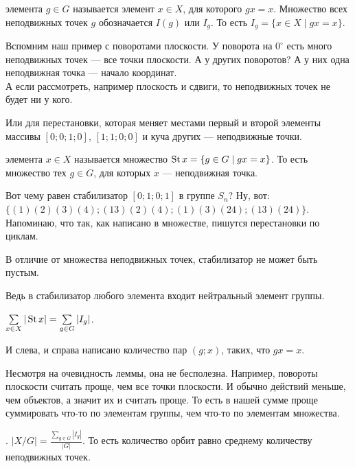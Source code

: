 \documentclass{article}
\begin{document}
\begin{itemize}
\begin{Example}
        \end{Example}
        \dfn {} элемента $g\in G$ называется элемент $x\in X$, для которого $gx=x$. Множество всех неподвижных точек $g$ обозначается $I(g)$ или $I_g$. То есть $I_g=\{x\in X\mid gx=x\}$.
        \begin{Example}
            Вспомним наш пример с поворотами плоскости. У поворота на $0^\circ$ есть много неподвижных точек --- все точки плоскости. А у других поворотов? А у них одна неподвижная точка --- начало координат.\\
            А если рассмотреть, например плоскость и сдвиги, то неподвижных точек не будет ни у кого.
        \end{Example}
        \begin{Example}
            Или для перестановки, которая меняет местами первый и второй элементы массивы $[0;0;1;0]$, $[1;1;0;0]$ и куча других --- неподвижные точки.
        \end{Example}
        \dfn {} элемента $x\in X$ называется множество $\operatorname{St} x=\{g\in G\mid gx=x\}$. То есть множество тех $g\in G$, для которых $x$ --- неподвижная точка.
        \begin{Example}
            Вот чему равен стабилизатор $[0;1;0;1]$ в группе $S_n$? Ну, вот: $\{(1)(2)(3)(4);(13)(2)(4);(1)(3)(24);(13)(24)\}$. Напоминаю, что так, как написано в множестве, пишутся перестановки по циклам.
        \end{Example}
        \thm В отличие от множества неподвижных точек, стабилизатор не может быть пустым.
        \begin{Proof}
            Ведь в стабилизатор любого элемента входит нейтральный элемент группы.
        \end{Proof}
        \thm $\sum\limits_{x\in X}|\operatorname{St} x|=\sum\limits_{g\in G}|I_g|$.
        \begin{Proof}
            И слева, и справа написано количество пар $(g;x)$, таких, что $gx=x$.
        \end{Proof}
        \begin{Comment}
            Несмотря на очевидность леммы, она не бесполезна. Например, повороты плоскости считать проще, чем все точки плоскости. И обычно действий меньше, чем объектов, а значит их и считать проще. То есть в нашей сумме проще суммировать что-то по элементам группы, чем что-то по элементам множества.
        \end{Comment}
        \thm {}. $|X/G|=\frac{\sum_{g\in G}|I_g|}{|G|}$. То есть количество орбит равно среднему количеству неподвижных точек.

\end{itemize}
\end{document}
